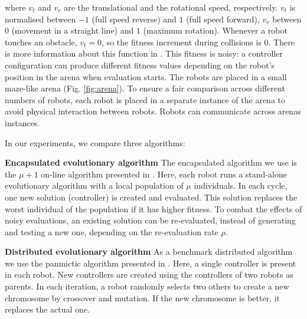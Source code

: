 \documentclass[runningheads]{llncs}
\begin{document}
\noindent where $v_{t}$ and $v_{r}$ are the translational and the rotational speed, respectively. $v_t$ is normalised between $-1$ (full speed reverse) and $1$ (full speed forward), $v_r$ between $0$ (movement in a straight line) and $1$ (maximum rotation). Whenever a robot touches an obstacle, $v_t = 0$, so the fitness increment during collisions is 0. There is more information about this function in \cite{HUIJSMAN11}. This fitness is noisy: a controller configuration can produce different fitness values depending on the robot's position in the arena when evaluation starts. 
The robots are placed in a small maze-like arena
(Fig. \ref{fig:arena}). %
To ensure a fair comparison across different numbers of robots, each robot is placed in a separate instance of the arena to avoid physical interaction between robots. Robots can communicate across arenas instances.

In our experiments, we compare three algorithms:

{\bf Encapsulated evolutionary algorithm}
The encapsulated algorithm we use is the $\mu+1$ on-line algorithm presented in \cite{Haasdijk2010On-line-evoluti}. Here, each robot runs a stand-alone evolutionary algorithm with a local population of $\mu$ individuals. In each cycle, one new solution (controller) is created and evaluated. This solution replaces the worst individual of the population if it has higher fitness. To combat the effects of noisy evaluations, an existing solution can be re-evaluated, instead of generating and testing a new one, depending on the re-evaluation rate $\rho$. %

{\bf Distributed evolutionary algorithm}
As a benchmark distributed algorithm we use the panmictic algorithm presented in \cite{HUIJSMAN11}. Here, a single controller is present in each robot. New controllers are created using the controllers of two robots as parents. In each iteration, a robot randomly selects two others to create a new chromosome by crossover and mutation. If the new chromosome is better, it replaces the actual one.

\end{document}
